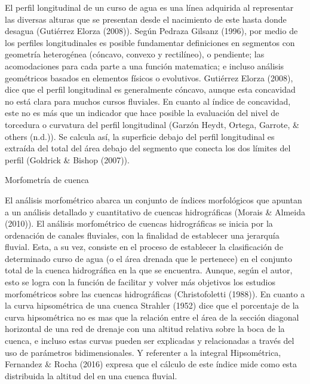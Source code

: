 \documentclass[11pt,]{article}
\begin{document}
El perfil longitudinal de un curso de agua es una línea adquirida al
representar las diversas alturas que se presentan desde el nacimiento de
este hasta donde desagua (Gutiérrez Elorza (2008)). Según Pedraza
Gilsanz (1996), por medio de los perfiles longitudinales es posible
fundamentar definiciones en segmentos con geometría heterogénea
(cóncavo, convexo y rectilíneo), o pendiente; las acomodaciones para
cada parte a una función matematica; e incluso análisis geométricos
basados en elementos físicos o evolutivos. Gutiérrez Elorza (2008), dice
que el perfil longitudinal es generalmente cóncavo, aunque esta
concavidad no está clara para muchos cursos fluviales. En cuanto al
índice de concavidad, este no es más que un indicador que hace posible
la evaluación del nivel de torcedura o curvatura del perfil longitudinal
(Garzón Heydt, Ortega, Garrote, \& others (n.d.)). Se calcula así, la
superficie debajo del perfil longitudinal es extraída del total del área
debajo del segmento que conecta los dos límites del perfil (Goldrick \&
Bishop (2007)).

Morfometría de cuenca

El análisis morfométrico abarca un conjunto de índices morfológicos que
apuntan a un análisis detallado y cuantitativo de cuencas hidrográficas
(Morais \& Almeida (2010)). El análisis morfométrico de cuencas
hidrográficas se inicia por la ordenación de canales fluviales, con la
finalidad de establecer una jerarquía fluvial. Esta, a su vez, consiste
en el proceso de establecer la clasificación de determinado curso de
agua (o el área drenada que le pertenece) en el conjunto total de la
cuenca hidrográfica en la que se encuentra. Aunque, según el autor, esto
se logra con la función de facilitar y volver más objetivos los estudios
morfométricos sobre las cuencas hidrográficas (Christofoletti (1988)).
En cuanto a la curva hipsométrica de una cuenca Strahler (1952) dice que
el porcentaje de la curva hipsométrica no es mas que la relación entre
el área de la sección diagonal horizontal de una red de drenaje con una
altitud relativa sobre la boca de la cuenca, e incluso estas curvas
pueden ser explicadas y relacionadas a través del uso de parámetros
bidimensionales. Y referenter a la integral Hipsométrica, Fernandez \&
Rocha (2016) expresa que el cálculo de este índice mide como esta
distribuida la altitud del en una cuenca fluvial.
\end{document}
